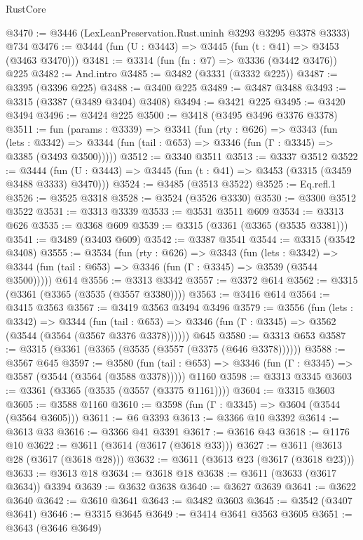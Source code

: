 \begin{lexlean}{RustCore}
\begin{coremodule}
@3470 := @3446 (LexLeanPreservation.Rust.uninh @3293 @3295 @3378 @3333) @734
@3476 := @3444 (fun (U : @3443) => @3445 (fun (t : @41) => @3453 (@3463 @3470)))
@3481 := @3314 (fun (fn : @7) => @3336 (@3442 @3476)) @225
@3482 := And.intro
@3485 := @3482 (@3331 (@3332 @225))
@3487 := @3395 (@3396 @225)
@3488 := @3400 @225
@3489 := @3487 @3488
@3493 := @3315 (@3387 (@3489 @3404) @3408)
@3494 := @3421 @225
@3495 := @3420 @3494
@3496 := @3424 @225
@3500 := @3418 (@3495 @3496 @3376 @3378)
@3511 := fun (params : @3339) =>
  @3341
    (fun (rty : @626) =>
    @3343
      (fun (lets : @3342) =>
      @3344 (fun (tail : @653) => @3346 (fun (Γ : @3345) => @3385 (@3493 @3500)))))
@3512 := @3340 @3511
@3513 := @3337 @3512
@3522 := @3444 (fun (U : @3443) => @3445 (fun (t : @41) => @3453 (@3315 (@3459 @3488 @3333) @3470)))
@3524 := @3485 (@3513 @3522)
@3525 := Eq.refl.{1}
@3526 := @3525 @3318
@3528 := @3524 (@3526 @3330)
@3530 := @3300 @3512 @3522
@3531 := @3313 @3339
@3533 := @3531 @3511 @609
@3534 := @3313 @626
@3535 := @3368 @609
@3539 := @3315 (@3361 (@3365 (@3535 @3381)))
@3541 := @3489 (@3403 @609)
@3542 := @3387 @3541
@3544 := @3315 (@3542 @3408)
@3555 := @3534
    (fun (rty : @626) =>
    @3343
      (fun (lets : @3342) =>
      @3344 (fun (tail : @653) => @3346 (fun (Γ : @3345) => @3539 (@3544 @3500)))))
    @614
@3556 := @3313 @3342
@3557 := @3372 @614
@3562 := @3315 (@3361 (@3365 (@3535 (@3557 @3380))))
@3563 := @3416 @614
@3564 := @3415 @3563
@3567 := @3419 @3563 @3494 @3496
@3579 := @3556
    (fun (lets : @3342) =>
    @3344
      (fun (tail : @653) => @3346 (fun (Γ : @3345) => @3562 (@3544 (@3564 (@3567 @3376 @3378))))))
    @645
@3580 := @3313 @653
@3587 := @3315 (@3361 (@3365 (@3535 (@3557 (@3375 (@646 @3378))))))
@3588 := @3567 @645
@3597 := @3580
    (fun (tail : @653) => @3346 (fun (Γ : @3345) => @3587 (@3544 (@3564 (@3588 @3378)))))
    @1160
@3598 := @3313 @3345
@3603 := @3361 (@3365 (@3535 (@3557 (@3375 @1161))))
@3604 := @3315 @3603
@3605 := @3588 @1160
@3610 := @3598 (fun (Γ : @3345) => @3604 (@3544 (@3564 @3605)))
@3611 := @6 @3393
@3613 := @3366 @10 @3392
@3614 := @3613 @33
@3616 := @3366 @41 @3391
@3617 := @3616 @43
@3618 := @1176 @10
@3622 := @3611 (@3614 (@3617 (@3618 @33)))
@3627 := @3611 (@3613 @28 (@3617 (@3618 @28)))
@3632 := @3611 (@3613 @23 (@3617 (@3618 @23)))
@3633 := @3613 @18
@3634 := @3618 @18
@3638 := @3611 (@3633 (@3617 @3634)) @3394
@3639 := @3632 @3638
@3640 := @3627 @3639
@3641 := @3622 @3640
@3642 := @3610 @3641
@3643 := @3482 @3603
@3645 := @3542 (@3407 @3641)
@3646 := @3315 @3645
@3649 := @3414 @3641 @3563 @3605
@3651 := @3643 (@3646 @3649)

\end{coremodule}
\end{lexlean}
